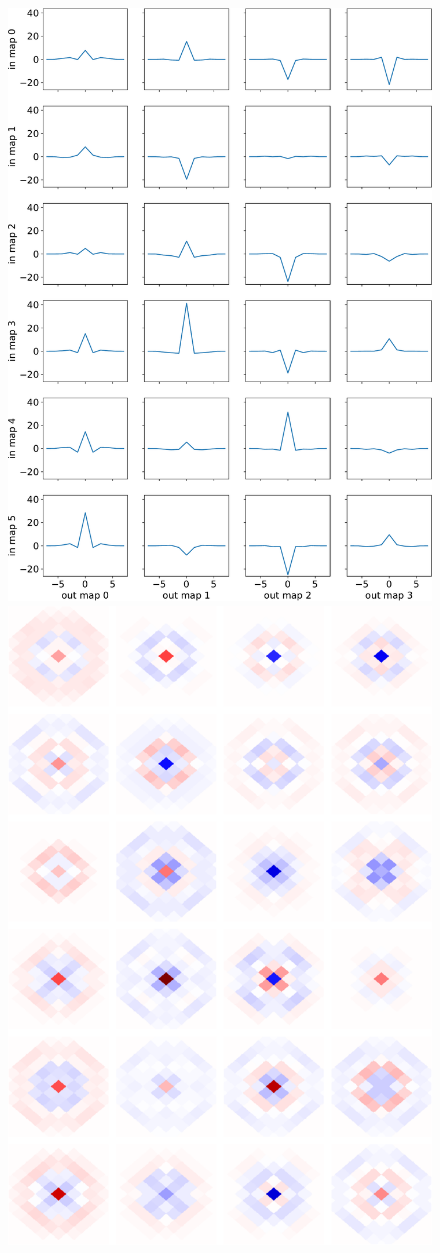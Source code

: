 \documentclass[final,twocolumn,3p,times,sort&compress]{elsarticle}
\newcommand{\1}{\b{1}}              %
\newcommand{\0}{\b{0}}              %
\begin{document}
\begin{figure}
	\centering
	\includegraphics[width=0.85\linewidth]{section_filter_last}
	\vspace{0.5cm}\\
	\includegraphics[width=0.85\linewidth]{gnonomic_filter_last}

\end{figure}
\end{document}

